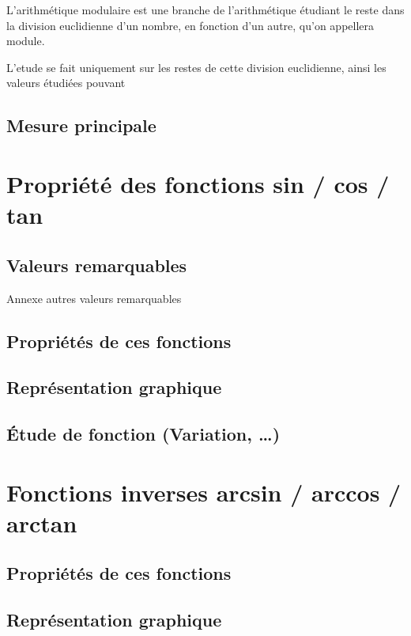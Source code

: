\documentclass[a4paper]{article}
\begin{document}
			L'arithmétique modulaire est une branche de l'arithmétique étudiant le reste dans la division euclidienne d'un nombre, en fonction d'un autre, qu'on appellera module. 

			L'etude se fait uniquement sur les restes de cette division euclidienne, ainsi les valeurs étudiées pouvant 

		\subsection{Mesure principale}

	\section{Propriété des fonctions sin / cos / tan}

		\subsection{Valeurs remarquables}

			Annexe autres valeurs remarquables 

		\subsection{Propriétés de ces fonctions}

		\subsection{Représentation graphique}

		\subsection{Étude de fonction (Variation, …)}

	\section{Fonctions inverses arcsin / arccos / arctan}

		\subsection{Propriétés de ces fonctions}

		\subsection{Représentation graphique}
\end{document}
